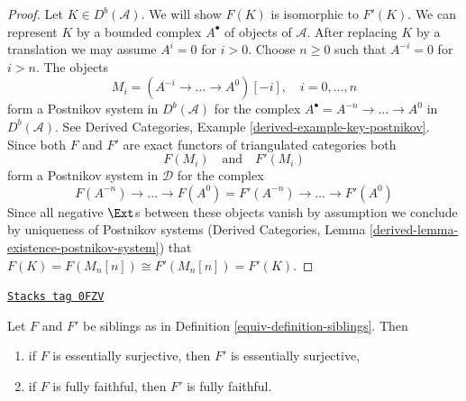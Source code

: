 \begin{proof}
Let $K \in D^b(\mathcal{A})$. We will show $F(K)$ is isomorphic to $F'(K)$.
We can represent $K$ by a bounded complex $A^\bullet$ of objects of
$\mathcal{A}$. After replacing $K$ by a translation we may
assume $A^i = 0$ for $i > 0$. Choose $n \geq 0$ such that $A^{-i} = 0$
for $i > n$. The objects
$$
M_i = (A^{-i} \to \ldots \to A^0)[-i],\quad i = 0, \ldots, n
$$
form a Postnikov system in $D^b(\mathcal{A})$ for the complex
$A^\bullet = A^{-n} \to \ldots \to A^0$ in $D^b(\mathcal{A})$.
See Derived Categories, Example \ref{derived-example-key-postnikov}.
Since both $F$ and $F'$ are exact functors of triangulated categories both
$$
F(M_i)
\quad\text{and}\quad
F'(M_i)
$$
form a Postnikov system in $\mathcal{D}$ for the complex
$$
F(A^{-n}) \to \ldots \to F(A^0) =
F'(A^{-n}) \to \ldots \to F'(A^0)
$$
Since all negative $\Ext$s between these objects vanish by assumption
we conclude by uniqueness of Postnikov systems
(Derived Categories, Lemma \ref{derived-lemma-existence-postnikov-system})
that $F(K) = F(M_n[n]) \cong F'(M_n[n]) = F'(K)$.
\end{proof}

\begin{lemma}
\label{equiv-lemma-sibling-faithful}
\href{https://stacks.math.columbia.edu/tag/0FZV}{\texttt{Stacks tag 0FZV}}

Let $F$ and $F'$ be siblings as in Definition \ref{equiv-definition-siblings}.
Then
\begin{enumerate}
\item if $F$ is essentially surjective, then $F'$ is essentially
surjective,
\item if $F$ is fully faithful, then $F'$ is fully faithful.
\end{enumerate}
\end{lemma}

